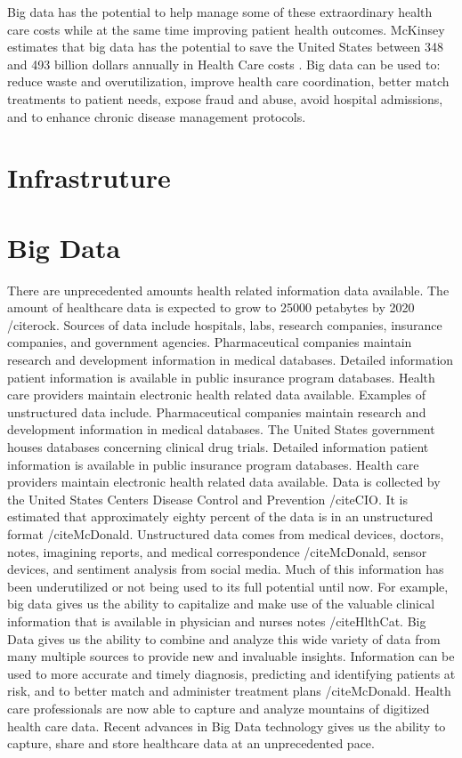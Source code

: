 \documentclass[sigconf]{acmart}
\begin{document}
Big data has the potential to help manage some of these extraordinary health care costs while at the same time improving patient health outcomes. McKinsey estimates that big data has the potential to save the United States between 348 and 493 billion dollars annually in Health Care costs \cite{CIO}. Big data can be used to:  reduce waste and overutilization, improve health care coordination, better match treatments to patient needs, expose fraud and abuse, avoid hospital admissions, and to enhance chronic disease management protocols. 


\section{Infrastruture}


\section{Big Data}
There are unprecedented amounts health related information data available. The amount of healthcare data is expected to grow to 25000 petabytes by 2020 /cite{rock}. Sources of data include hospitals, labs, research companies, insurance companies, and government agencies. Pharmaceutical companies maintain research and development information in medical databases. Detailed information patient information is available in public insurance program databases. Health care providers maintain electronic health related data available.  Examples of unstructured data include. Pharmaceutical companies maintain research and development information in medical databases. The United States government houses databases concerning clinical drug trials. Detailed information patient information is available in public insurance program databases. Health care providers maintain electronic health related data available. Data is collected by the United States Centers Disease Control and Prevention /cite{CIO}. It is estimated that approximately eighty percent of the data is in an unstructured format /cite{McDonald}.  Unstructured data comes from medical devices, doctors, notes, imagining reports, and medical correspondence /cite{McDonald}, sensor devices, and sentiment analysis from social media.  Much of this information has been underutilized or not being used to its full potential until now. For example, big data gives us the ability to capitalize and make use of the valuable clinical information that is available in physician and nurses notes /cite{HlthCat}.  Big Data gives us the ability to combine and analyze this wide variety of data from many multiple sources to provide new and invaluable insights. Information can be used to more accurate and timely diagnosis, predicting and identifying patients at risk, and to better match and administer treatment plans /cite{McDonald}. 
Health care professionals are now able to capture and analyze mountains of digitized health care data. Recent advances in Big Data technology gives us the ability to capture, share and store healthcare data at an unprecedented pace.
\end{document}
